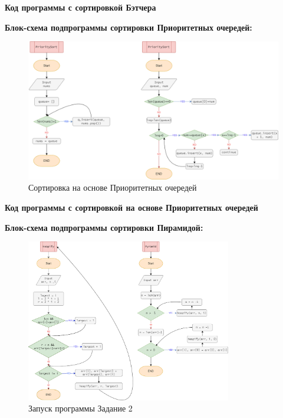 \textbf{Код программы с сортировкой Бэтчера}





\textbf{Блок-схема подпрограммы сортировки Приоритетных очередей:}




\begin{figure}[H]
    \centering
    \includegraphics[width=1\textwidth]{./flowcharts/priority.drawio.png}
    \caption{Сортировка на основе Приоритетных очередей}
\end{figure}

\textbf{Код программы с сортировкой на основе Приоритетных очередей}




\textbf{Блок-схема подпрограммы сортировки Пирамидой:}



\begin{figure}[H]
    \centering
    \includegraphics[width=0.8\textwidth]{./flowcharts/pyramid.drawio.png}
    \caption{Запуск программы Задание 2}
\end{figure}

